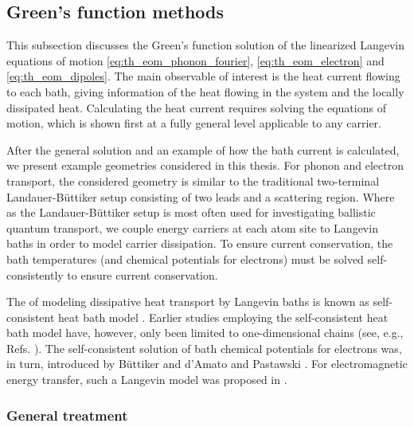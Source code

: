 
\subsection{Green's function methods}
\label{sec:methods_gf}

This subsection discusses the Green's function solution of the linearized Langevin equations of motion \eqref{eq:th_eom_phonon_fourier}, \eqref{eq:th_eom_electron} and \eqref{eq:th_eom_dipoles}. The main observable of interest is the heat current flowing to each bath, giving information of the heat flowing in the system and the locally dissipated heat. Calculating the heat current requires solving the equations of motion, which is shown first at a fully general level applicable to any carrier. 

After the general solution and an example of how the bath current is calculated, we present example geometries considered in this thesis. For phonon and electron transport, the considered geometry is similar to the traditional two-terminal Landauer-B\"uttiker setup \cite{buttiker92,datta} consisting of two leads and a scattering region. Where as the Landauer-B\"uttiker setup is most often used for investigating ballistic quantum transport, we couple energy carriers at each atom site to Langevin baths in order to model carrier dissipation. To ensure current conservation, the bath temperatures (and chemical potentials for electrons) must be solved self-consistently to ensure current conservation. 

The of modeling dissipative heat transport by Langevin baths is known as self-consistent heat bath model \cite{bolsterli70}. Earlier studies employing the self-consistent heat bath model have, however, only been limited to one-dimensional chains (see, e.g., Refs. \cite{dhar03,dhar06,segal09,bandyopadhyay11}). The self-consistent solution of bath chemical potentials for electrons was, in turn, introduced by B\"uttiker \cite{buttiker86} and d'Amato and Pastawski \cite{damato90}. For electromagnetic energy transfer, such a Langevin model was proposed in .

\subsubsection{General treatment}

